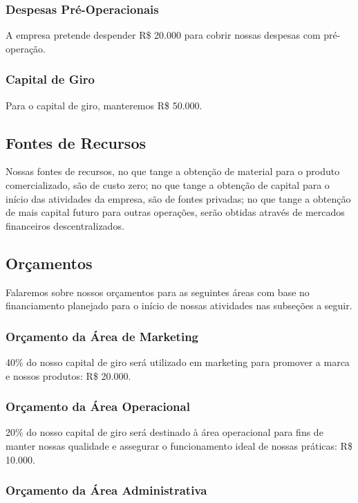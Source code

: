 \documentclass[onecolumn,12pt]{asme2ej}
\begin{document}
\subsubsection{Despesas Pré-Operacionais}

A empresa pretende despender R\$ 20.000 para cobrir nossas despesas com pré-operação.

\subsubsection{Capital de Giro}

Para o capital de giro, manteremos R\$ 50.000.

\subsection{Fontes de Recursos}

Nossas fontes de recursos, no que tange a obtenção de material para o produto comercializado, são de custo zero; no que tange a obtenção de capital para o início das atividades da empresa, são de fontes privadas; no que tange a obtenção de mais capital futuro para outras operações, serão obtidas através de mercados financeiros descentralizados.

\subsection{Orçamentos}

Falaremos sobre nossos orçamentos para as seguintes áreas com base no financiamento planejado para o início de nossas atividades nas subseções a seguir.

\subsubsection{Orçamento da Área de Marketing}

40\% do nosso capital de giro será utilizado em marketing para promover a marca e nossos produtos: R\$ 20.000.

\subsubsection{Orçamento da Área Operacional}

20\% do nosso capital de giro será destinado à área operacional para fins de manter nossas qualidade e assegurar o funcionamento ideal de nossas práticas: R\$ 10.000.

\subsubsection{Orçamento da Área Administrativa}
\end{document}
